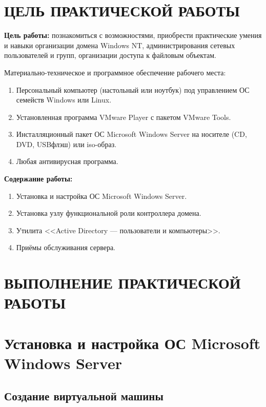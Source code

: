 \section*{ЦЕЛЬ ПРАКТИЧЕСКОЙ РАБОТЫ}

\textbf{Цель работы:}
познакомиться с возможностями, приобрести практические умения и
навыки организации домена Windows NT,
администрирования сетевых пользователей и
групп, организации доступа к файловым объектам.

Материально-техническое и программное обеспечение рабочего места:

\begin{enumerate}
	\item Персональный компьютер (настольный или ноутбук)
		под управлением ОС семейств Windows или Linux.
	\item Установленная программа VMware Player с пакетом VMware Tools.
	\item Инсталляционный пакет ОС Microsoft Windows Server
		на носителе (CD, DVD, USBфлэш) или iso-образ.
	\item Любая антивирусная программа.
\end{enumerate}

\textbf{Содержание работы:}

\begin{enumerate}
	\item Установка и настройка ОС Microsoft Windows Server.
	\item Установка узлу функциональной роли контроллера домена.
	\item Утилита <<Active Directory --- пользователи и компьютеры>>.
	\item Приёмы обслуживания сервера.
\end{enumerate}

\clearpage

\section*{ВЫПОЛНЕНИЕ ПРАКТИЧЕСКОЙ РАБОТЫ}

\section{Установка и настройка ОС Microsoft Windows Server}

\subsection{Создание виртуальной машины}


